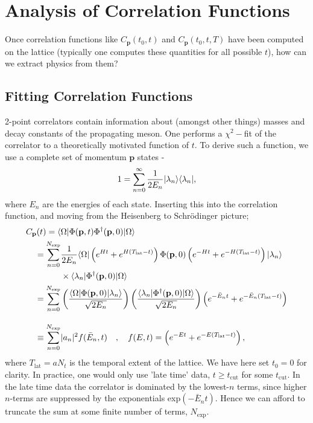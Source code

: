 \section{Analysis of Correlation Functions}

Once correlation functions like $C_{\textbf{p}}(t_0,t)$ and $C_{\textbf{p}}(t_0,t,T)$ have been computed on the lattice (typically one computes these quantities for all possible $t$), how can we extract physics from them?

\subsection{Fitting Correlation Functions}
\label{sec:correlator_fits}

2-point correlators contain information about (amongst other things) masses and decay constants of the propagating meson. One performs a $\chi^2-$fit of the correlator to a theoretically motivated function of $t$. To derive such a function, we use a complete set of momentum ${\textbf{p}}$ states -
\begin{align}
  1 = \sum_{n=0}^{\infty} {1\over 2E_n} | \lambda_n \rangle \langle \lambda_n |,
\end{align}
where $E_n$ are the energies of each state. Inserting this into the correlation function, and moving from the Heisenberg to Schr\"odinger picture;
\begin{align}
  C_{\textbf{p}}(t) = \langle& \Omega | \Phi({\textbf{p}},t) \Phi^{\dagger}({\textbf{p}},0)|\Omega\rangle \nonumber \\
  =\sum_{n=0}^{N_{\text{exp}}} & {1\over 2E_n} \langle \Omega | \left( e^{Ht} + e^{H(T_{\text{lat}}-t)} \right)  \Phi({\textbf{p}},0) \left( e^{-Ht} + e^{-H(T_{\text{lat}}-t)} \right) | \lambda_n \rangle
  \nonumber
  \\
  &\times \langle \lambda_n | \Phi^{\dagger}({\textbf{p}},0) | \Omega \rangle
  \nonumber
  \\  = \sum_{n=0}^{N_{\text{exp}}} & \left( {\langle \Omega | \Phi({\textbf{p}},0) | \lambda_n \rangle \over \sqrt{2E_n}} \right) \left( {\langle \lambda_n | \Phi^{\dagger}({\textbf{p}},0) | \Omega \rangle \over \sqrt{2E_n} } \right) \left( e^{-\bar{E}_n t} + e^{-\bar{E}_n (T_{\text{lat}}-t)} \right)
  \nonumber
  \\[10pt] \equiv \sum_{n=0}^{N_{\text{exp}}} & |a_n|^2 f(\bar{E}_n,t) \quad,\quad f(E,t) = \left( e^{-E t} + e^{-E(T_{\text{lat}}-t)} \right),
  \label{eq:multiexponential}
\end{align}
where $T_{\text{lat}}=aN_t$ is the temporal extent of the lattice. We have here set $t_0=0$ for clarity. In practice, one would only use 'late time' data,  $t\geq t_{\text{cut}}$ for some $t_{\text{cut}}$. In the late time data the correlator is dominated by the lowest-$n$ terms, since higher $n$-terms are suppressed by the exponentials exp$(-\bar{E}_nt)$. Hence we can afford to truncate the sum at some finite number of terms, $N_{\text{exp}}$. 

